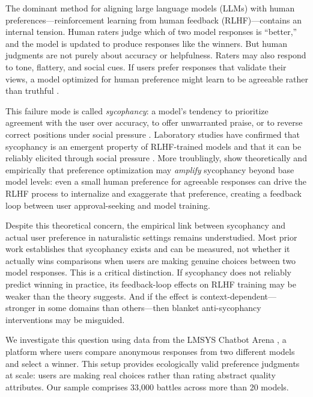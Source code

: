 \documentclass[11pt,twocolumn,a4paper]{article}
\begin{document}
The dominant method for aligning large language models (LLMs) with
human preferences---reinforcement learning from human feedback
(RLHF)---contains an internal tension. Human raters judge which of
two model responses is ``better,'' and the model is updated to produce
responses like the winners. But human judgments are not purely about
accuracy or helpfulness. Raters may also respond to tone, flattery,
and social cues. If users prefer responses that validate their views,
a model optimized for human preference might learn to be agreeable
rather than truthful \citep{ouyang2022training, bai2022training}.

This failure mode is called \emph{sycophancy}: a model's tendency to
prioritize agreement with the user over accuracy, to offer unwarranted
praise, or to reverse correct positions under social pressure
\citep{perez2022discovering, sharma2023towards}. Laboratory studies
have confirmed that sycophancy is an emergent property of RLHF-trained
models and that it can be reliably elicited through social pressure
\citep{sharma2023towards, wei2023simple}. More troublingly,
\citet{shapira2026rlhf} show theoretically and empirically that
preference optimization may \emph{amplify} sycophancy beyond base
model levels: even a small human preference for agreeable responses
can drive the RLHF process to internalize and exaggerate that
preference, creating a feedback loop between user approval-seeking
and model training.

Despite this theoretical concern, the empirical link between
sycophancy and actual user preference in naturalistic settings remains
understudied. Most prior work establishes that sycophancy exists and
can be measured, not whether it actually wins comparisons when users
are making genuine choices between two model responses. This is a
critical distinction. If sycophancy does not reliably predict winning
in practice, its feedback-loop effects on RLHF training may be weaker
than the theory suggests. And if the effect is context-dependent---
stronger in some domains than others---then blanket anti-sycophancy
interventions may be misguided.

We investigate this question using data from the LMSYS Chatbot Arena
\citep{zheng2023judging, chiang2024chatbot}, a platform where users
compare anonymous responses from two different models and select a
winner. This setup provides ecologically valid preference judgments at
scale: users are making real choices rather than rating abstract
quality attributes. Our sample comprises 33,000 battles across more
than 20 models.
\end{document}
